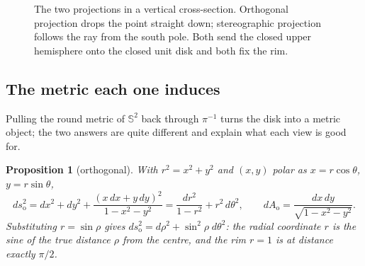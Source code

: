 \documentclass[11pt,a4paper]{article}
\newcommand{\Sph}{\mathbb{S}^2}
\newcommand{\D}{\mathbb{D}}
\newcommand{\proj}[1]{\pi_{\mathrm{#1}}}
\newcommand{\po}{\proj{o}}
\newcommand{\ps}{\proj{s}}
\newcommand{\vv}{\mathbf{v}}
\theoremstyle{plain}
\newtheorem{proposition}{Proposition}[section]
\theoremstyle{definition}
\theoremstyle{remark}
\begin{document}
\begin{figure}[t]
\centering
{}
\caption{The two projections in a vertical cross-section. Orthogonal projection
drops the point straight down; stereographic projection follows the ray from the
south pole. Both send the closed upper hemisphere onto the closed unit disk and
both fix the rim.}
\label{fig:cross-section}
\end{figure}

\subsection{The metric each one induces}

Pulling the round metric of $\Sph$ back through $\pi^{-1}$ turns the disk into a
metric object; the two answers are quite different and explain what each view is
good for.

\begin{proposition}[orthogonal]
With $r^2=x^2+y^2$ and $(x,y)$ polar as $x=r\cos\theta$, $y=r\sin\theta$,
\begin{equation}
  ds_{\mathrm{o}}^2
    =dx^2+dy^2+\frac{(x\,dx+y\,dy)^2}{1-x^2-y^2}
    =\frac{dr^2}{1-r^2}+r^2\,d\theta^2,
  \qquad
  dA_{\mathrm{o}}=\frac{dx\,dy}{\sqrt{1-x^2-y^2}}.
\end{equation}
Substituting $r=\sin\rho$ gives $ds_{\mathrm{o}}^2=d\rho^2+\sin^2\!\rho\;d\theta^2$:
the radial coordinate $r$ is the \emph{sine} of the true distance $\rho$ from
the centre, and the rim $r=1$ is at distance exactly $\pi/2$.
\end{proposition}
\end{document}
